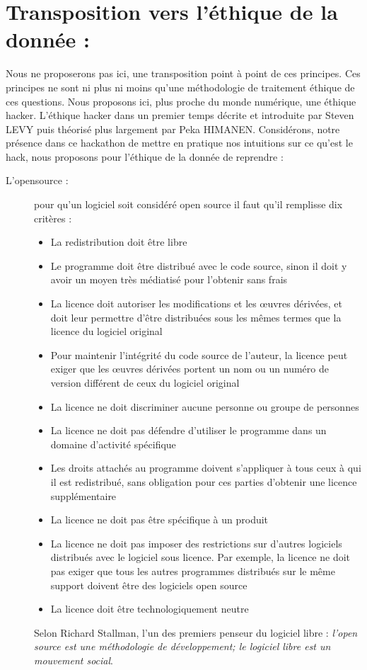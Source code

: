 \documentclass[a4paper,12pt]{article}
\begin{document}
\section{Transposition vers l'éthique de la donnée : }
Nous ne proposerons pas ici, une transposition point à point de ces principes. Ces principes ne sont ni plus ni moins qu'une méthodologie de traitement éthique de ces questions. 
Nous proposons ici, plus proche du monde numérique, une éthique hacker. L'éthique hacker dans un premier temps décrite et introduite par Steven LEVY puis théorisé plus largement par Peka HIMANEN. Considérons, notre présence dans ce hackathon de mettre en pratique nos intuitions sur ce qu'est le hack, nous proposons pour l'éthique de la donnée de reprendre :
	\begin{description}
		\item [L'opensource : ] pour qu'un logiciel soit considéré open source il faut qu'il remplisse dix critères :
		\begin{itemize}
			\item  La redistribution doit être libre
			\item Le programme doit être distribué avec le code source, sinon il doit y avoir un moyen très médiatisé pour l’obtenir sans frais
			\item La licence doit autoriser les modifications et les œuvres dérivées, et doit leur permettre d'être distribuées sous les mêmes termes que la licence du logiciel original
			\item Pour maintenir l’intégrité du code source de l'auteur, la licence peut exiger que les œuvres dérivées portent un nom ou un numéro de version différent de ceux du logiciel original
			\item La licence ne doit discriminer aucune personne ou groupe de personnes
			\item La licence ne doit pas défendre d'utiliser le programme dans un domaine d'activité spécifique
			\item Les droits attachés au programme doivent s'appliquer à tous ceux à qui il est redistribué, sans obligation pour ces parties d'obtenir une licence supplémentaire
			\item La licence ne doit pas être spécifique à un produit
			\item La licence ne doit pas imposer des restrictions sur d'autres logiciels distribués avec le logiciel sous licence. Par exemple, la licence ne doit pas exiger que tous les autres programmes distribués sur le même support doivent être des logiciels open source 
			\item La licence doit être technologiquement neutre
		\end{itemize}	
Selon Richard Stallman, l'un des premiers penseur du logiciel libre : \textit{l'open source est une méthodologie de développement; le logiciel libre est un mouvement social}. 


\end{description}
\end{document}

